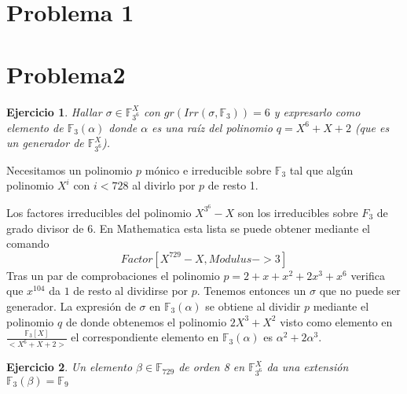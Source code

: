 \documentclass{article}
\theoremstyle{theorem-style}  %
\theoremstyle{definition-style}
\theoremstyle{example-style}
\newtheorem{exercise}{Ejercicio}[section]
\begin{document}
\makeatletter\renewcommand{\ALG@name}{Algoritmo}

\maketitle



\newpage
\tableofcontents
\newpage

\section{Problema 1}

\newpage
\section{Problema2}

\begin{exercise}
	Hallar $\sigma \in \mathbb{F}_{3^6}^X$ con $gr(Irr(\sigma,\mathbb{F}_3)) = 6$ y expresarlo como elemento de $\mathbb{F}_3(\alpha)$ donde $\alpha$ es una raíz del polinomio $q = X^6 + X + 2$ (que es un generador de $\mathbb{F}_{3^6}^X$).
\end{exercise}

Necesitamos un polinomio $p$ mónico e irreducible sobre $\mathbb{F}_3$ tal que algún polinomio $X^{i}$ con $i < 728$ al divirlo por $p$ de resto 1. 

Los factores irreducibles del polinomio $X^{3^6} - X$ son los irreducibles sobre $F_3$ de grado divisor de $6$. En Mathematica esta lista se puede obtener mediante el comando $$Factor[X^{729} - X, Modulus -> 3]$$ Tras un par de comprobaciones el polinomio $p = 2+x+x^2+2x^3+x^6$ verifica que $x^{104}$  da $1$ de resto al dividirse por $p$. Tenemos entonces un $\sigma$ que no puede ser generador. La expresión de $\sigma$ en $\mathbb{F}_3(\alpha)$ se obtiene al dividir $p$ mediante el polinomio $q$ de donde obtenemos el polinomio $2X^3+X^2$ visto como elemento en $\frac{\mathbb{F}_3[X]}{<X^6+X+2>}$ el correspondiente elemento en $\mathbb{F}_3(\alpha)$ es $\alpha^2+2 \alpha^3$. 

\begin{exercise}
	Un elemento $\beta \in \mathbb{F}_{729}$ de orden 8 en $\mathbb{F}_{3^6}^X$ da una extensión $\mathbb{F}_3(\beta) = \mathbb{F}_9$
\end{exercise}
\end{document}
